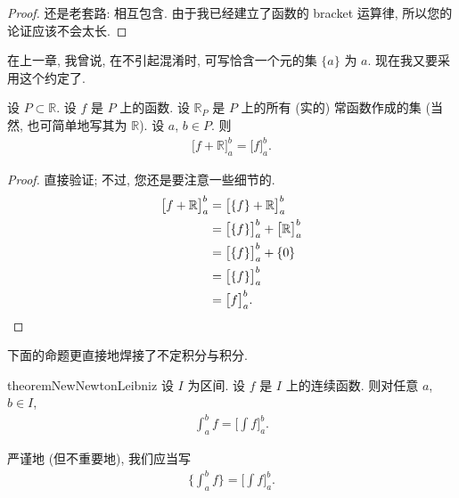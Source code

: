 \begin{proof}
    还是老套路: 相互包含.
    由于我已经建立了函数的 bracket 运算律,
    所以您的论证应该不会太长.
\end{proof}

在上一章, 我曾说, 在不引起混淆时,
可写恰含一个元的集 $\{ a \}$ 为 $a$.
现在我又要采用这个约定了.

\begin{theorem}
    设 $P \subset \mathbb{R}$.
    设 $f$ 是 $P$ 上的函数.
    设 $\mathbb{R}_P$ 是 $P$ 上的所有 (实的) 常函数作成的集
    (当然, 也可简单地写其为 $\mathbb{R}$).
    设 $a$, $b \in P$.
    则
    \begin{align*}
        \big[ f + \mathbb{R} \big]_{a}^{b} = \big[ f \big]_{a}^{b}.
    \end{align*}
\end{theorem}

\begin{proof}
    直接验证;
    不过, 您还是要注意一些细节的.
    \begin{align*}
        \big[ f + \mathbb{R} \big]_{a}^{b}
        = {} & \big[ \{f\} + \mathbb{R} \big]_{a}^{b}                     \\
        = {} & \big[ \{f\} \big]_{a}^{b} + \big[ \mathbb{R} \big]_{a}^{b} \\
        = {} & \big[ \{f\} \big]_{a}^{b} + \{ 0 \}                        \\
        = {} & \big[ \{f\} \big]_{a}^{b}                                  \\
        = {} & \big[ f \big]_{a}^{b}. \qedhere
    \end{align*}
\end{proof}

下面的命题更直接地焊接了不定积分与积分.


\begin{restatable}{theorem}{NewNewtonLeibniz}
    设 $I$ 为区间.
    设 $f$ 是 $I$ 上的连续函数.
    则对任意 $a$, $b \in I$,
    \begin{align*}
        \int_{a}^{b} {f} = \Bigg[ \int {f} \Bigg]_{a}^{b}.
    \end{align*}
\end{restatable}

\begin{remark}
    严谨地 (但不重要地), 我们应当写
    \begin{align*}
        \Bigg\{ \int_{a}^{b} {f} \Bigg\} = \Bigg[ \int {f} \Bigg]_{a}^{b}.
    \end{align*}
\end{remark}

